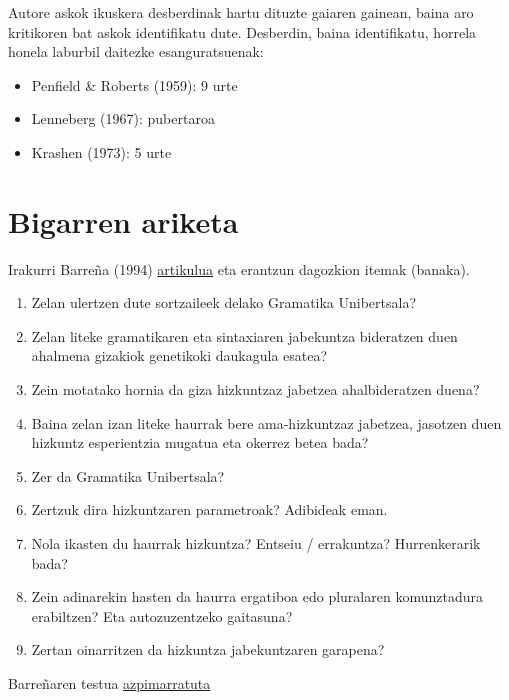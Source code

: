 \documentclass[
]{book}
\providecommand{\tightlist}{%
  \setlength{\itemsep}{0pt}\setlength{\parskip}{0pt}}
\begin{document}
Autore askok ikuskera desberdinak hartu dituzte gaiaren gainean, baina aro kritikoren bat askok identifikatu dute. Desberdin, baina identifikatu, horrela honela laburbil daitezke esanguratsuenak:

\begin{itemize}
\tightlist
\item
  Penfield \& Roberts (1959): 9 urte
\item
  Lenneberg (1967): pubertaroa
\item
  Krashen (1973): 5 urte
\end{itemize}

\hypertarget{T1A2}{%
\section*{Bigarren ariketa}\label{T1A2}}

Irakurri Barreña (1994) \href{https://zientzia.eus/artikuluak/chomskyren-arauak-eta-hizkuntz-jabekuntza/}{artikulua} eta erantzun dagozkion itemak (banaka).

\begin{enumerate}
\def\labelenumi{\arabic{enumi}.}
\tightlist
\item
  Zelan ulertzen dute sortzaileek delako Gramatika Unibertsala?
\item
  Zelan liteke gramatikaren eta sintaxiaren jabekuntza bideratzen duen ahalmena gizakiok genetikoki daukagula esatea?
\item
  Zein motatako hornia da giza hizkuntzaz jabetzea ahalbideratzen duena?
\item
  Baina zelan izan liteke haurrak bere ama-hizkuntzaz jabetzea, jasotzen duen hizkuntz esperientzia mugatua eta okerrez betea bada?
\item
  Zer da Gramatika Unibertsala?
\item
  Zertzuk dira hizkuntzaren parametroak? Adibideak eman.
\item
  Nola ikasten du haurrak hizkuntza? Entseiu / errakuntza? Hurrenkerarik bada?
\item
  Zein adinarekin hasten da haurra ergatiboa edo pluralaren komunztadura erabiltzen? Eta autozuzentzeko gaitasuna?
\item
  Zertan oinarritzen da hizkuntza jabekuntzaren garapena?
\end{enumerate}

Barreñaren testua \href{../beste/Barena/Barrena_1994_Chomskyren_arauak_eta_hizkuntz_jabekuntza.pdf}{azpimarratuta}
\end{document}
